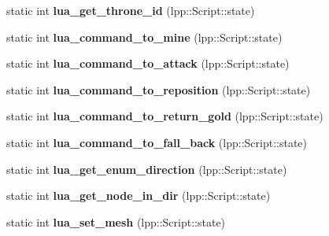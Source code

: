 \begin{DoxyCompactItemize}
\item 
static int {\bfseries lua\+\_\+get\+\_\+throne\+\_\+id} (lpp\+::\+Script\+::state)\hypertarget{class_lua_interface_a9eaf35a68a3087989121f36474d4b0fe}{}\label{class_lua_interface_a9eaf35a68a3087989121f36474d4b0fe}

\item 
static int {\bfseries lua\+\_\+command\+\_\+to\+\_\+mine} (lpp\+::\+Script\+::state)\hypertarget{class_lua_interface_a3cd1be7ff7b06294f6a66efbfeee7071}{}\label{class_lua_interface_a3cd1be7ff7b06294f6a66efbfeee7071}

\item 
static int {\bfseries lua\+\_\+command\+\_\+to\+\_\+attack} (lpp\+::\+Script\+::state)\hypertarget{class_lua_interface_a1fb505ff6b59e9bfa5ab87807d75bae6}{}\label{class_lua_interface_a1fb505ff6b59e9bfa5ab87807d75bae6}

\item 
static int {\bfseries lua\+\_\+command\+\_\+to\+\_\+reposition} (lpp\+::\+Script\+::state)\hypertarget{class_lua_interface_ad520a98ea394025d5332210a9c3e1471}{}\label{class_lua_interface_ad520a98ea394025d5332210a9c3e1471}

\item 
static int {\bfseries lua\+\_\+command\+\_\+to\+\_\+return\+\_\+gold} (lpp\+::\+Script\+::state)\hypertarget{class_lua_interface_a27d683ce4a5b270413c99344a4078c40}{}\label{class_lua_interface_a27d683ce4a5b270413c99344a4078c40}

\item 
static int {\bfseries lua\+\_\+command\+\_\+to\+\_\+fall\+\_\+back} (lpp\+::\+Script\+::state)\hypertarget{class_lua_interface_aa22a3fb04f40b166b45b930825a90bbc}{}\label{class_lua_interface_aa22a3fb04f40b166b45b930825a90bbc}

\item 
static int {\bfseries lua\+\_\+get\+\_\+enum\+\_\+direction} (lpp\+::\+Script\+::state)\hypertarget{class_lua_interface_a983b36d571294e832c237119daa65187}{}\label{class_lua_interface_a983b36d571294e832c237119daa65187}

\item 
static int {\bfseries lua\+\_\+get\+\_\+node\+\_\+in\+\_\+dir} (lpp\+::\+Script\+::state)\hypertarget{class_lua_interface_a83d576d5113c1cf8cc0f9e298962e3d1}{}\label{class_lua_interface_a83d576d5113c1cf8cc0f9e298962e3d1}

\item 
static int {\bfseries lua\+\_\+set\+\_\+mesh} (lpp\+::\+Script\+::state)\hypertarget{class_lua_interface_abef84137aa944683616cd1e96db814de}{}\label{class_lua_interface_abef84137aa944683616cd1e96db814de}


\end{DoxyCompactItemize}
